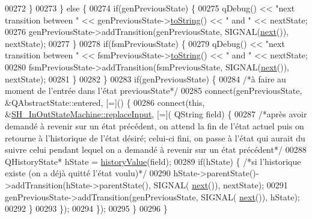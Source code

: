 \begin{DoxyCode}
00272         \}
00273     \} \textcolor{keywordflow}{else} \{
00274         \textcolor{keywordflow}{if}(genPreviousState) \{
00275             qDebug() << \textcolor{stringliteral}{"next transition between "} << genPreviousState->\hyperlink{classSH__GenericState_a5480c5ee725fd801d8f6292cd4c803b8}{toString}() << \textcolor{stringliteral}{" and "} << 
      nextState;
00276             genPreviousState->addTransition(genPreviousState, SIGNAL(\hyperlink{classSH__InOutStateMachine_aa9ee51efe0e17dcf5366c8a97b523892}{next}()), nextState);
00277         \}
00278         \textcolor{keywordflow}{if}(fsmPreviousState) \{
00279             qDebug() << \textcolor{stringliteral}{"next transition between "} << fsmPreviousState->\hyperlink{classSH__InOutStateMachine_a60ecd7de03d948e2d1e9cbedb5c3e5fa}{toString}() << \textcolor{stringliteral}{" and "} << 
      nextState;
00280             fsmPreviousState->addTransition(fsmPreviousState, SIGNAL(\hyperlink{classSH__InOutStateMachine_aa9ee51efe0e17dcf5366c8a97b523892}{next}()), nextState);
00281         \}
00282     \}
00283     \textcolor{keywordflow}{if}(genPreviousState) \{
00284         \textcolor{comment}{/*à faire au moment de l'entrée dans l'état previousState*/}
00285         connect(genPreviousState, &QAbstractState::entered, [=]() \{
00286             connect(\textcolor{keyword}{this}, &\hyperlink{classSH__InOutStateMachine_af5f82970faef3bca48a147863dba2ee1}{SH\_InOutStateMachine::replaceInput}, [=](
      QString field) \{
00287                 \textcolor{comment}{/*après avoir demandé à revenir sur un état précédent, on attend la fin de l'état actuel
       puis on retourne à l'historique de l'état désiré; celui-ci fini, on passe à l'état qui aurait du suivre celui
       pendant lequel on a demandé à revenir sur un état précédent*/}
00288                 QHistoryState* hState = \hyperlink{classSH__InOutStateMachine_a84fb2b2c2105cae9c590c0d15960854a}{historyValue}(field);
00289                 \textcolor{keywordflow}{if}(hState) \{ \textcolor{comment}{/*si l'historique existe (on a déjà quitté l'état voulu)*/}
00290                     hState->parentState()->addTransition(hState->parentState(), SIGNAL(
      \hyperlink{classSH__InOutStateMachine_aa9ee51efe0e17dcf5366c8a97b523892}{next}()), nextState);
00291                     genPreviousState->addTransition(genPreviousState, SIGNAL(
      \hyperlink{classSH__InOutStateMachine_aa9ee51efe0e17dcf5366c8a97b523892}{next}()), hState);
00292                 \}
00293             \});
00294         \});
00295     \}
00296 \}
\end{DoxyCode}


